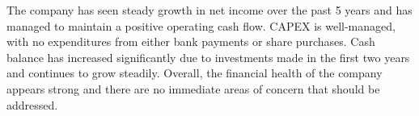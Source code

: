 

The company has seen steady growth in net income over the past 5 years and has managed to maintain a positive operating cash flow. CAPEX is well-managed, with no expenditures from either bank payments or share purchases. Cash balance has increased significantly due to investments made in the first two years and continues to grow steadily. Overall, the financial health of the company appears strong and there are no immediate areas of concern that should be addressed.